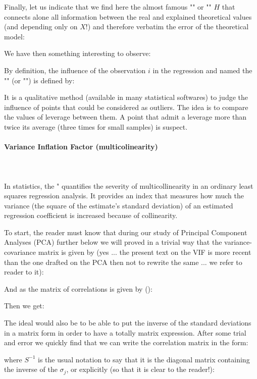 	Finally, let us indicate that we find here the almost famous "" or "" $H$ that connects alone all information between the real and explained theoretical values (and depending only on $X$!) and therefore verbatim the error of the theoretical model:
	
	We have then something interesting to observe:
	
	By definition, the influence of the observation $i$ in the regression and named the  "" (or "") is defined by:
	
	It is a qualitative method (available in many statistical softwares) to judge the influence of points that could be considered as outliers. The idea is to compare the values of leverage between them. A point that admit a leverage more than twice its average (three times for small samples) is suspect.
	
	\paragraph{Variance Inflation Factor (multicolinearity)}\mbox{}\\\\
	In statistics, the " quantifies the severity of multicollinearity in an ordinary least squares regression analysis. It provides an index that measures how much the variance (the square of the estimate's standard deviation) of an estimated regression coefficient is increased because of collinearity.

	To start, the reader must know that during our study of Principal Component Analyses (PCA) further below we will proved in a trivial way that the variance-covariance matrix is given by (yes ... the present text on the VIF is more recent than the one drafted on the PCA then not to rewrite the same ... we refer to reader to it):
	
	And as the matrix of correlations is given by ():
	
	Then we get:
	
	The ideal would also be to be able to put the inverse of the standard deviations in a matrix form in order to have a totally matrix expression. After some trial and error we quickly find that we can write the correlation matrix in the form:
	
	where $S^{-1}$ is the usual notation to say that it is the diagonal matrix containing the inverse of the $\sigma_j$, or explicitly (so that it is clear to the reader!):
	
